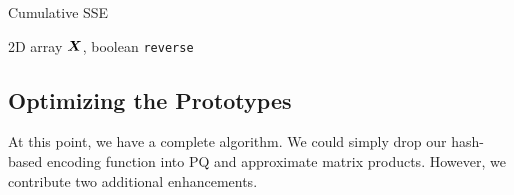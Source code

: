 \begin{algorithm}[h]
\caption{Cumulative SSE} \label{algo:cumSSE}
\begin{algorithmic}[1]
     2D array $\bm{X}$, boolean \texttt{reverse}
    \ENDIF


    \ENDFOR
        \ENDFOR
    \ENDFOR
\end{algorithmic}
\end{algorithm}

\subsection{Optimizing the Prototypes}

At this point, we have a complete algorithm. We could simply drop our hash-based encoding function into PQ and approximate matrix products. However, we contribute two additional enhancements.

